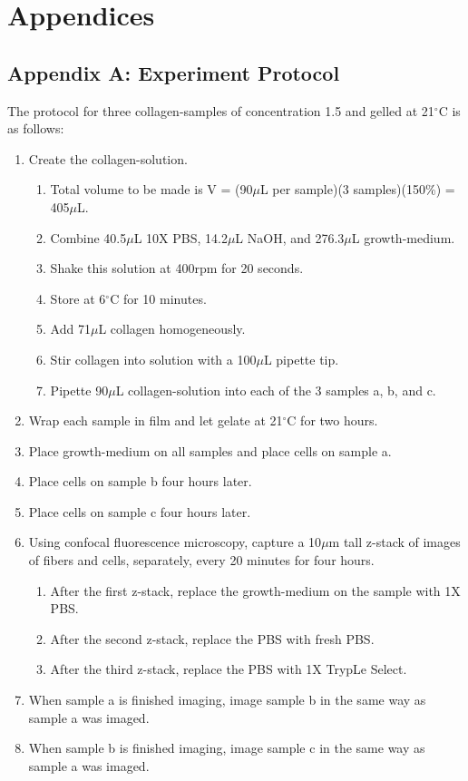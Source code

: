 \documentclass[ twocolumn,notitlepage]{ revtex4-1}
\begin{document}
\newpage\section*{Appendices}
\subsection*{Appendix A: Experiment Protocol}
The protocol for three collagen-samples of concentration 1.5 and gelled at 21$^{\circ}$C is as follows:
\begin{enumerate}
	\item Create the collagen-solution.
	\begin{enumerate}
		\item Total volume to be made is V = (90$\mu$L per sample)(3 samples)(150\%) = 405$\mu$L.
		\item Combine 40.5$\mu$L 10X PBS, 14.2$\mu$L NaOH, and 276.3$\mu$L growth-medium.
		\item Shake this solution at 400rpm for 20 seconds.
		\item Store at 6$^{\circ}$C for 10 minutes.
		\item Add 71$\mu$L collagen homogeneously.
		\item Stir collagen into solution with a 100$\mu$L pipette tip.
		\item Pipette 90$\mu$L collagen-solution into each of the 3 samples a, b, and c.
		\end{enumerate}
	\item Wrap each sample in film and let gelate at 21$^{\circ}$C for two hours.
	\item Place growth-medium on all samples and place cells on sample a.
	\item Place cells on sample b four hours later.
	\item Place cells on sample c four hours later.
	\item Using confocal fluorescence microscopy, capture a 10$\mu$m tall z-stack of images of fibers and cells, separately, every 20 minutes for four hours.
	\begin{enumerate}
		\item After the first z-stack, replace the growth-medium on the sample with 1X PBS.
		\item After the second z-stack, replace the PBS with fresh PBS.
		\item After the third z-stack, replace the PBS with 1X TrypLe\texttrademark\hspace{.1em} Select.
	\end{enumerate}
		\item When sample a is finished imaging, image sample b in the same way as sample a was imaged.
		\item When sample b is finished imaging, image sample c in the same way as sample a was imaged.
\end{enumerate}
\end{document}
